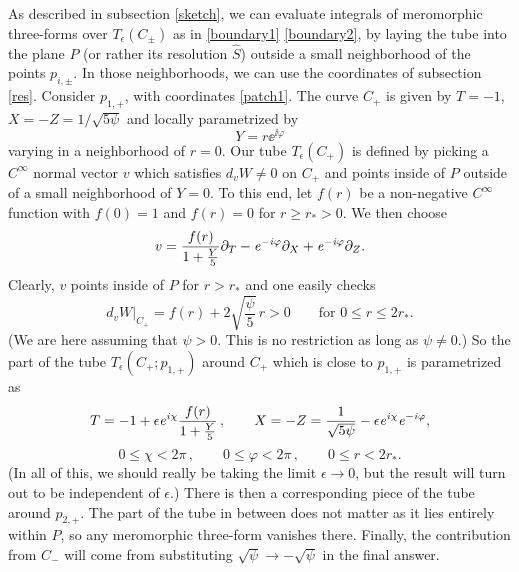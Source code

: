 As described in subsection \ref{sketch}, we can evaluate integrals of
meromorphic three-forms over $T_\epsilon(C_\pm)$ as in \eqref{boundary1}
\eqref{boundary2}, by laying the tube into the plane $P$ (or rather its 
resolution $\widehat S$) outside a small neighborhood of the points
$p_{i,\pm}$. In those neighborhoods, we can use the coordinates of subsection
\ref{res}. Consider $p_{1,+}$, with coordinates \eqref{patch1}. The curve 
$C_+$ is given by $T=-1$, $X=-Z=1/\sqrt{5\psi}$ and locally parametrized by 
\begin{equation}
Y = r\ee^{\ii\varphi}
\end{equation}
varying in a neighborhood of $r=0$. Our tube $T_\epsilon(C_+)$ is defined
by picking a $C^\infty$ normal vector $v$ which satisfies $d_v W\neq 0$ on 
$C_+$ and points inside of $P$ outside of a small neighborhood of $Y=0$. 
To this end, let $f(r)$ be a non-negative $C^\infty$ function with $f(0)=1$ 
and $f(r)=0$ for $r\ge r_*>0$. We then choose 
\begin{equation}
\eqlabel{normal}
v = \frac{f(r)}{1+\frac{Y}{5}} \del_T -\ee^{-\ii\varphi}\del_X
+ \ee^{-\ii\varphi}\del_Z .
\end{equation}
Clearly, $v$ points inside of $P$ for $r>r_*$ and one easily checks
\def\sqrtpf{{\textstyle\sqrt{\frac{\psi}{5}}}}
\begin{equation}
d_v W|_{C_+} = f(r) + 2\sqrtpf\, r > 0
\qquad \text{for $0\le r \le 2 r_*$} .
\end{equation}
(We are here assuming that $\psi>0$. This is no restriction as long
as $\psi\neq 0$.) So the part of the tube $T_\epsilon(C_+;p_{1,+})$
around $C_+$ which is close to $p_{1,+}$ is parametrized as
\begin{equation}
\eqlabel{tube}
T=-1+\epsilon \ee^{\ii\chi} \frac{f(r)}{1+\frac Y5}\,,
\qquad X=-Z=\frac{1}{\sqrt{5\psi}}-\epsilon\ee^{\ii\chi}\ee^{-\ii\varphi} ,
\end{equation}
\begin{equation}
0\le \chi < 2\pi\,, \qquad
0\le \varphi < 2\pi\,, \qquad
0\le r < 2 r_* .
\end{equation}
(In all of this, we should really be taking the limit $\epsilon\to 0$, but 
the result will turn out to be independent of $\epsilon$.) There is then a 
corresponding piece of the tube around $p_{2,+}$. The part of the tube in 
between does not matter as it lies entirely within $P$, so any meromorphic 
three-form vanishes there. Finally, the contribution from $C_-$ will come 
from substituting $\sqrt{\psi}\to -\sqrt{\psi}$ in the final answer. 

